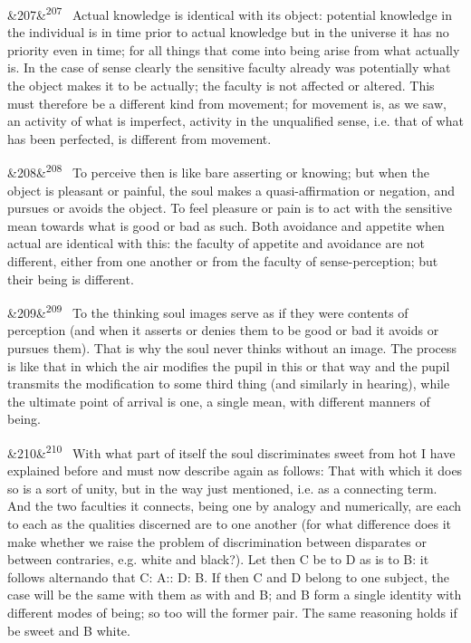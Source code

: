 \documentclass[12pt]{article}
\newcommand{\para}[1][]{\par\noindent\ifx&#1&\else\textsuperscript{\footnotesize #1}~\fi}
\begin{document}
\para[207] Actual knowledge is identical with its object: potential knowledge in the individual is in time prior to actual knowledge but in the universe it has no priority even in time; for all things that come into being arise from what actually is. In the case of sense clearly the sensitive faculty already was potentially what the object makes it to be actually; the faculty is not affected or altered. This must therefore be a different kind from movement; for movement is, as we saw, an activity of what is imperfect, activity in the unqualified sense, i.e. that of what has been perfected, is different from movement.

\para[208] To perceive then is like bare asserting or knowing; but when the object is pleasant or painful, the soul makes a quasi-affirmation or negation, and pursues or avoids the object. To feel pleasure or pain is to act with the sensitive mean towards what is good or bad as such. Both avoidance and appetite when actual are identical with this: the faculty of appetite and avoidance are not different, either from one another or from the faculty of sense-perception; but their being is different.

\para[209] To the thinking soul images serve as if they were contents of perception (and when it asserts or denies them to be good or bad it avoids or pursues them). That is why the soul never thinks without an image. The process is like that in which the air modifies the pupil in this or that way and the pupil transmits the modification to some third thing (and similarly in hearing), while the ultimate point of arrival is one, a single mean, with different manners of being.

\para[210] With what part of itself the soul discriminates sweet from hot I have explained before and must now describe again as follows: That with which it does so is a sort of unity, but in the way just mentioned, i.e. as a connecting term. And the two faculties it connects, being one by analogy and numerically, are each to each as the qualities discerned are to one another (for what difference does it make whether we raise the problem of discrimination between disparates or between contraries, e.g. white and black?). Let then C be to D as is to B: it follows alternando that C: A:: D: B. If then C and D belong to one subject, the case will be the same with them as with and B; and B form a single identity with different modes of being; so too will the former pair. The same reasoning holds if be sweet and B white.
\end{document}
